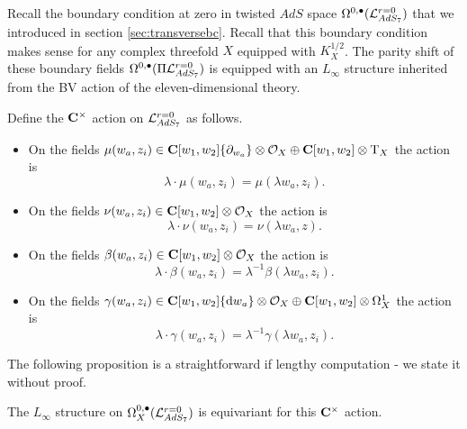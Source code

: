 \documentclass[../main.tex]{subfiles}
\begin{document}
Recall the boundary condition at zero in twisted $AdS$ space $\Omega^{0,\bullet}(\mathcal L_{AdS_7}^{r=0})$ that we introduced in section \ref{sec:transversebc}.
Recall that this boundary condition makes sense for any complex threefold $X$ equipped with $K^{1/2}_X$.
The parity shift of these boundary fields $\Omega^{0,\bullet}(\Pi \mathcal L_{AdS_7}^{r=0})$ is equipped with an $L_\infty$ structure inherited from the BV action of the eleven-dimensional theory.

Define the $\mathbf{C}^\times$ action on $\mathcal{L}^{{r=0}}_{AdS_7}$ as follows.
\begin{itemize}
\item On the fields $\mu(w_a,z_i) \in \mathbf{C}[w_1, w_2]\{\partial_{w_a}\} \otimes \mathcal O_X \oplus \mathbf{C}[w_1, w_2] \otimes {\mathrm{T}}_X$ the action is
\[
\lambda \cdot \mu(w_a,z_i) = \mu(\lambda w_a , z_i).
\]
\item On the fields $\nu(w_a,z_i) \in \mathbf{C}[w_1, w_2]\otimes \mathcal O_X$ the action is
\[
\lambda \cdot \nu(w_a,z_i) = \nu(\lambda w_a , z).
\]
\item On the fields $\beta(w_a,z_i) \in \mathbf{C}[w_1, w_2]\otimes \mathcal O_X$ the action is
\[
\lambda \cdot \beta(w_a,z_i) = \lambda^{-1} \beta(\lambda w_a , z_i).
\]
\item On the fields $\gamma(w_a,z_i) \in \mathbf{C}[w_1, w_2] \{\mathrm{d} w_a\}\otimes \mathcal O_X \oplus \mathbf{C}[w_1, w_2]\otimes \Omega^1_X$ the action is
\[
\lambda \cdot \gamma(w_a,z_i) = \lambda^{-1} \gamma(\lambda w _a, z_i).
\]
\end{itemize}

The following proposition is a straightforward if lengthy computation - we state it without proof.
\begin{prop}\label{prop:ads7decomp}
The $L_\infty$ structure on $\Omega^{0,\bullet}_{X} (\mathcal{L}^{{r=0}}_{AdS_7} )$ is equivariant for this $\mathbf{C}^\times$ action. 
\end{prop}
\end{document}
